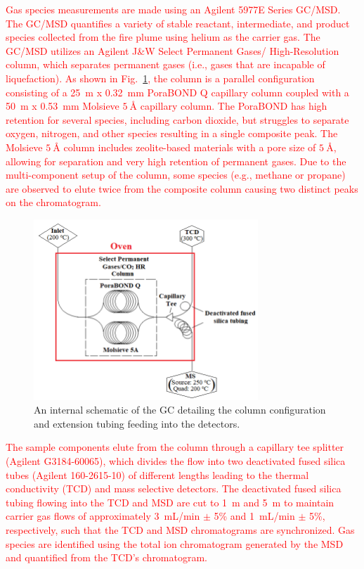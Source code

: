 \documentclass[12pt]{article}
\begin{document}
\textcolor{red}{Gas species measurements are made using an Agilent 5977E Series GC/MSD. The GC/MSD quantifies a variety of stable reactant, intermediate, and product species collected from the fire plume using helium as the carrier gas. The GC/MSD utilizes an Agilent J\&W Select Permanent Gases/ High-Resolution column, which separates permanent gases (i.e., gases that are incapable of liquefaction). As shown in Fig.~\ref{fig:GC_Intern}, the column is a parallel configuration consisting of a 25~m x 0.32~mm PoraBOND Q capillary column coupled with a 50~m x 0.53~mm Molsieve $\SI{5}{\angstrom}$ capillary column. The PoraBOND has high retention for several species, including carbon dioxide, but struggles to separate oxygen, nitrogen, and other species resulting in a single composite peak. The Molsieve $\SI{5}{\angstrom}$ column includes zeolite-based materials with a pore size of $\SI{5}{\angstrom}$, allowing for separation and very high retention of permanent gases. Due to the multi-component setup of the column, some species (e.g., methane or propane) are observed to elute twice from the composite column causing two distinct peaks on the chromatogram.}

\begin{figure}[h!]
	\centering
\includegraphics[width=8.45cm,keepaspectratio]{GC_Internal.png}
	\caption[A schematic of the internal plumbing system in the gas chromatograph]{An internal schematic of the GC detailing the column configuration and extension tubing feeding into the detectors.}
	\label{fig:GC_Intern}
\end{figure}

\textcolor{red}{The sample components elute from the column through a capillary tee splitter (Agilent G3184-60065), which divides the flow into two deactivated fused silica tubes (Agilent 160-2615-10) of different lengths leading to the thermal conductivity (TCD) and mass selective detectors. The deactivated fused silica tubing flowing into the TCD and MSD are cut to 1~m and 5~m to maintain carrier gas flows of approximately 3~mL/min $\pm$ 5\% and 1~mL/min $\pm$ 5\%, respectively, such that the TCD and MSD chromatograms are synchronized. Gas species are identified using the total ion chromatogram generated by the MSD and quantified from the TCD's chromatogram.}
\end{document}
